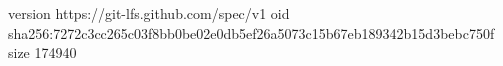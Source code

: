 version https://git-lfs.github.com/spec/v1
oid sha256:7272c3cc265c03f8bb0be02e0db5ef26a5073c15b67eb189342b15d3bebc750f
size 174940
